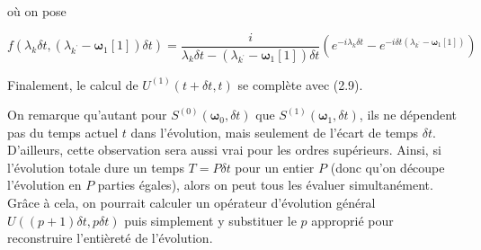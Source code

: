 où on pose

\begin{equation}
    f(\lambda_k\delta t, (\lambda_{k^\text{'}}-\boldsymbol{\omega}_1[1])\delta t) = \frac{i}{\lambda_k\delta t - (\lambda_{k^\text{'}} - \boldsymbol{\omega}_1[1])\delta t}\left(e^{-i\lambda_k\delta t} - e^{-i\delta t(\lambda_{k^\text{'}} - \boldsymbol{\omega}_1[1])} \right) 
\end{equation}

Finalement, le calcul de $U^{(1)}(t + \delta t, t)$ se complète avec (2.9).

On remarque qu'autant pour $S^{(0)}(\boldsymbol{\omega}_0, \delta t)$ que $S^{(1)}(\boldsymbol{\omega}_1, \delta t)$, ils ne dépendent pas du temps actuel $t$ dans l'évolution, mais seulement de l'écart de temps $\delta t$. D'ailleurs, cette observation sera aussi vrai pour les ordres supérieurs. Ainsi, si l'évolution totale dure un temps $T = P\delta t$ pour un entier $P$ (donc qu'on découpe l'évolution en $P$ parties égales), alors on peut tous les évaluer simultanément. Grâce à cela, on pourrait calculer un opérateur d'évolution général $U((p+1)\delta t, p\delta t)$ puis simplement y substituer le $p$ approprié pour reconstruire l'entièreté de l'évolution.




